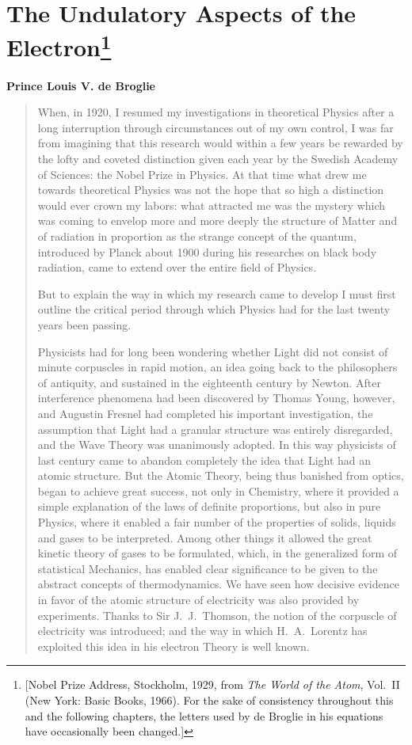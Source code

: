 \section*{The Undulatory Aspects of the Electron\footnote{{[}Nobel Prize Address,
  Stockholm, 1929, from \emph{The World of the Atom}, Vol.\ II (New York:
  Basic Books, 1966). For the sake of consistency throughout this and
  the following chapters, the letters used by de Broglie in his
  equations have occasionally been changed.{]}}}
\begin{center}
\textbf{Prince Louis V. de Broglie}
\end{center}

\begin{quotation}
When, in 1920, I resumed my investigations in theoretical Physics after
a long interruption through circumstances out of my own control, I was
far from imagining that this research would within a few years be
rewarded by the lofty and coveted distinction given each year by the
Swedish Academy of Sciences: the Nobel Prize in Physics. At that time
what drew me towards theoretical Physics was not the hope that so high a
distinction would ever crown my labors: what attracted me was the
mystery which was coming to envelop more and more deeply the structure
of Matter and of radiation in proportion as the strange concept of the
quantum, introduced by Planck about 1900 during his researches on black
body radiation, came to extend over the entire field of Physics.

But to explain the way in which my research came to develop I must first
outline the critical period through which Physics had for the last
twenty years been passing.

Physicists had for long been wondering whether Light did not consist of
minute corpuscles in rapid motion, an idea going back to the
philosophers of antiquity, and sustained in the eighteenth century by
Newton. After interference phenomena had been discovered by Thomas
Young, however, and Augustin Fresnel had completed his important
investigation, the assumption that Light had a granular structure was
entirely disregarded, and the Wave Theory was unanimously adopted. In
this way physicists of last century came to abandon completely the idea
that Light had an atomic structure. But the Atomic Theory, being thus
banished from optics, began to achieve great success, not only in
Chemistry, where it provided a simple explanation of the laws of
definite proportions, but also in pure Physics, where it enabled a fair
number of the properties of solids, liquids and gases to be interpreted.
Among other things it allowed the great kinetic theory of gases to be
formulated, which, in the generalized form of statistical Mechanics, has
enabled clear significance to be given to the abstract concepts of
thermodynamics. We have seen how decisive evidence in favor of the
atomic structure of electricity was also provided by experiments. Thanks
to Sir J.\ J.\ Thomson, the notion of the corpuscle of electricity was
introduced; and the way in which H.\ A.\ Lorentz has exploited this idea
in his electron Theory is well known.


\end{quotation}

